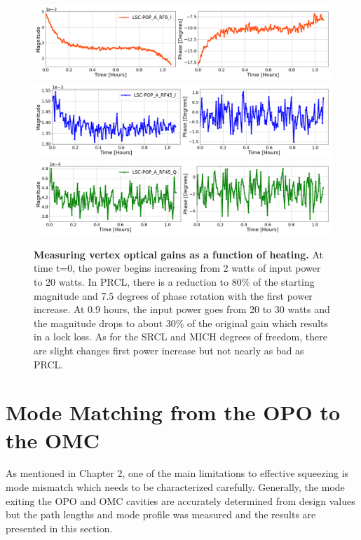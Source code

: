 	\begin{figure}[t!]
		\centering
		\includegraphics[width=1.0 \textwidth]{../Figures/PRCL_EXC_LSC-POP_A_RF9_I.png}
		\includegraphics[width=1.0 \textwidth]{../Figures/SRCL_EXC_LSC-POP_A_RF45_I.png}
		\includegraphics[width=1.0 \textwidth]{../Figures/MICH_EXC_LSC-POP_A_RF45_Q.png}
		\caption[Measuring vertex optical gains as a function of heating.]  
		{\textbf{Measuring vertex optical gains as a function of heating.}
		At time t=0, the power begins increasing from 2 watts of input power to 20 watts. In PRCL, there is a reduction to 80\% of the starting magnitude and 7.5 degrees of phase rotation with the first power increase. At 0.9 hours, the input power goes from 20 to 30 watts and the magnitude drops to about 30\% of the original gain which results in a lock loss.  As for the SRCL and MICH degrees of freedom, there are slight changes first power increase but not nearly as bad as PRCL.
		}
		\label{fig:POP18_POP90}
	\end{figure}

\clearpage

\section{Mode Matching from the OPO to the OMC}
	As mentioned in Chapter 2, one of the main limitations to effective squeezing is mode mismatch which needs to be characterized carefully.  Generally, the mode exiting the OPO and OMC cavities are accurately determined from design values but the path lengths and mode profile was measured and the results are presented in this section.
	
